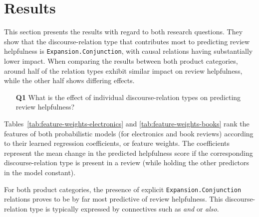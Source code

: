 \documentclass[
    a4paper,%
    12pt,%
    oneside,%
    toc=bibliography,
    final,
]{scrartcl}
\begin{document}
\section{Results}
\label{sec:results}

This section presents the results with regard to both research questions. They show that the discourse-relation type that contributes most to predicting review helpfulness is \lstinline|Expansion.Conjunction|, with causal relations having substantially lower impact. When comparing the results between both product categories, around half of the relation types exhibit similar impact on review helpfulness, while the other half shows differing effects.

\begin{enumerate}[rightmargin=1cm]
\item[\textbf{Q1}] What is the effect of individual discourse-relation types on predicting review helpfulness?
\end{enumerate}

Tables~\ref{tab:feature-weights-electronics} and \ref{tab:feature-weights-books} rank the features of both probabilistic models (for electronics and book reviews) according to their learned regression coefficients, or feature weights.
The coefficients represent the mean change in the predicted helpfulness score if the corresponding discourse-relation type is present in a review (while holding the other predictors in the model constant). 

For both product categories, the presence of explicit \lstinline|Expansion.Conjunction| relations proves to be by far most predictive of review helpfulness. This discourse-relation type is typically expressed by connectives such as \textit{and} or \textit{also}.
\end{document}
